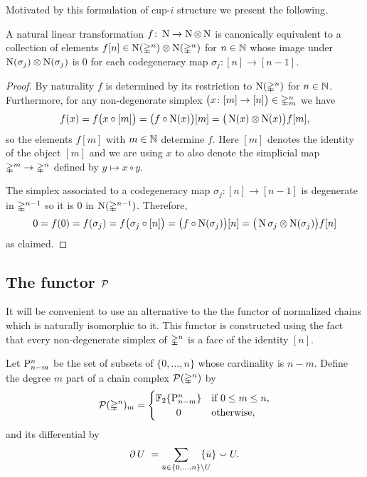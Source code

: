 Motivated by this formulation of cup-$i$ structure we present the following.

\begin{lemma} \label{l:natural linear map}
	A natural linear transformation $f \colon \chains \to \chains \ot \chains$ is canonically equivalent to a collection of elements $f[n] \in \chains(\simplex^n) \ot \chains(\simplex^n)$
	for $n \in \N$ whose image under $\chains(\sigma_j) \ot \chains(\sigma_j)$ is $0$
	for each codegeneracy map $\sigma_j \colon [n] \to [n-1]$.
\end{lemma}

\begin{proof}
	By naturality $f$ is determined by its restriction to $\chains(\simplex^n)$ for $n \in \N$.
	Furthermore, for any non-degenerate simplex $\big( x \colon [m] \to [n] \big) \in \simplex^n_m$ we have
	\[
	f(x) = f \big( x \circ [m] \big) =
	\big( f \circ \chains(x) \big) [m] =
	\big( \chains(x) \ot \chains(x) \big) f[m],
	\]
	so the elements $f[m]$ with $m \in \N$ determine $f$.
	Here $[m]$ denotes the identity of the object $[m]$ and we are using $x$ to also denote the simplicial map $\simplex^m \to \simplex^n$ defined by $y \mapsto x \circ y$.

	The simplex associated to a codegeneracy map $\sigma_j \colon [n] \to [n-1]$ is degenerate in $\simplex^{n-1}$ so it is $0$ in $\chains(\simplex^{n-1})$.
	Therefore,
	\[
	0 = f(0) = f(\sigma_j) =
	f \big( \sigma_j \circ [n] \big) =
	\big( f \circ \chains(\sigma_j) \big) [n] =
	\big( \chains \sigma_j \ot \chains(\sigma_j) \big) f[n]
	\]
	as claimed.
\end{proof}

\subsection{The functor $\cP$}

It will be convenient to use an alternative to the the functor of normalized chains which is naturally isomorphic to it.
This functor is constructed using the fact that every non-degenerate simplex of $\simplex^n$ is a face of the identity $[n]$.

\begin{definition} \label{d:dual standard chains}
	Let $\P_{n-m}^n$ be the set of subsets of $\{0, \dots, n\}$ whose cardinality is $n-m$.
	Define the degree $m$ part of a chain complex $\cP(\simplex^n)$ by
	\[
	\cP(\simplex^n)_m = \begin{cases}
	\F\{\P_{n-m}^n\} & \text{if } 0 \leq m \leq n, \\
	\hfil 0 & \text{otherwise},
	\end{cases}
	\]
	and its differential by
	\begin{equation} \label{e:boundary of P(simplex)}
	\bd U \ =
	\sum_{\bar u \in \{0, \dots, n\} \setminus U \kern-10pt} \{\bar u\} \union U.
	\end{equation}
\end{definition}

